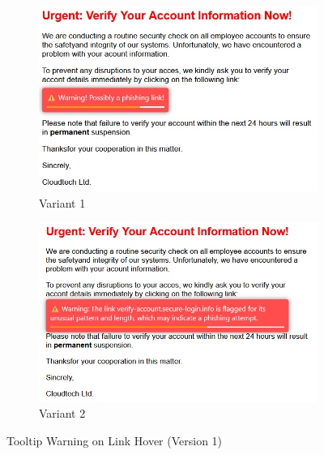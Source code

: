 \documentclass[
  a4paper,  %
  twoside,  %
  bibliography=totoc,
  headsepline,
  cleardoublepage=empty,
  parskip=half,
  draft=false
]{scrbook}
\begin{document}
\begin{figure} [H]
\centering
\begin{subfigure}{.5\textwidth}
  \centering
  \includegraphics[width=1\linewidth]{figures/hover1_old.png}
  \caption{Variant 1}
\end{subfigure}%
\begin{subfigure}{.5\textwidth}
  \centering
  \includegraphics[width=1\linewidth]{figures/hover2_old.png}
  \caption{Variant 2}
\end{subfigure}
\caption{Tooltip Warning on Link Hover (Version 1)}
\end{figure}
\end{document}

